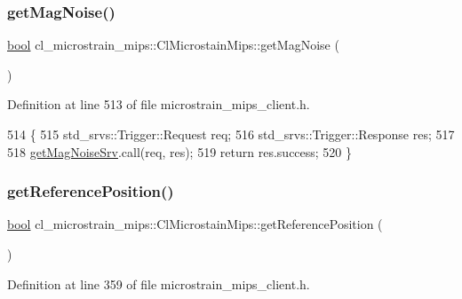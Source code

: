 \subsubsection{\texorpdfstring{get\+Mag\+Noise()}{getMagNoise()}}
{\footnotesize\ttfamily \hyperlink{classbool}{bool} cl\+\_\+microstrain\+\_\+mips\+::\+Cl\+Microstain\+Mips\+::get\+Mag\+Noise (\begin{DoxyParamCaption}{ }\end{DoxyParamCaption})\hspace{0.3cm}{\ttfamily [inline]}}



Definition at line 513 of file microstrain\+\_\+mips\+\_\+client.\+h.


\begin{DoxyCode}
514     \{
515         std\_srvs::Trigger::Request req;
516         std\_srvs::Trigger::Response res;
517 
518         \hyperlink{classcl__microstrain__mips_1_1ClMicrostainMips_a858136430bc226e36390517f28687a2a}{getMagNoiseSrv}.call(req, res);
519         \textcolor{keywordflow}{return} res.success;
520     \}
\end{DoxyCode}
\mbox{\label{classcl__microstrain__mips_1_1ClMicrostainMips_a1bb67145e871d3ce3637a713559a0121}} 
\subsubsection{\texorpdfstring{get\+Reference\+Position()}{getReferencePosition()}}
{\footnotesize\ttfamily \hyperlink{classbool}{bool} cl\+\_\+microstrain\+\_\+mips\+::\+Cl\+Microstain\+Mips\+::get\+Reference\+Position (\begin{DoxyParamCaption}{ }\end{DoxyParamCaption})\hspace{0.3cm}{\ttfamily [inline]}}



Definition at line 359 of file microstrain\+\_\+mips\+\_\+client.\+h.


